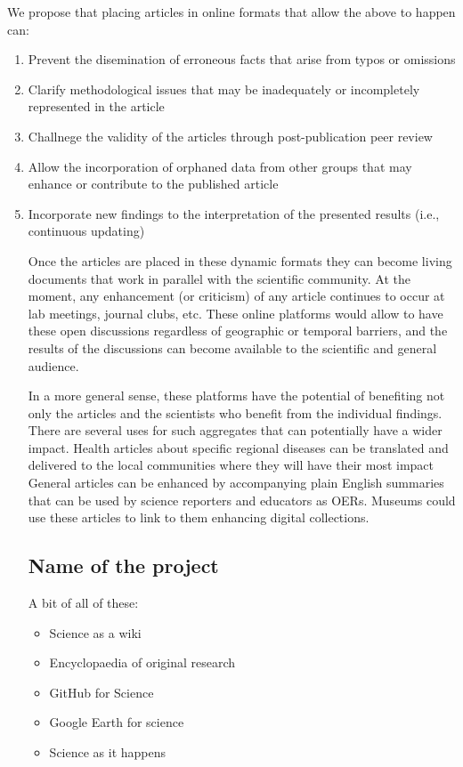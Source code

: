 \documentclass[final,authoryear,3p]{elsarticle-open-drafting}
\begin{document}
We propose that placing articles in online formats that allow the above to happen can:
\begin{enumerate}
\item Prevent the disemination of erroneous facts that arise from typos or omissions
\item Clarify methodological issues that may be inadequately or incompletely represented in the article
\item Challnege the validity of the articles through post-publication peer review
\item Allow the incorporation of orphaned data from other groups that may enhance or contribute to the published article
\item Incorporate new findings to the interpretation of the presented results (i.e., continuous updating)


Once the articles are placed in these dynamic formats they can become living documents that work in parallel with the scientific community. At the moment, any enhancement (or criticism) of any article continues to occur at lab meetings, journal clubs, etc. These online platforms would allow to have these open discussions regardless of geographic or temporal barriers, and the results of the discussions can become available to the scientific and general audience. 

In a more general sense, these platforms have the potential of benefiting not only the articles and the scientists who benefit from the individual findings. There are several uses for such aggregates that can potentially have a wider impact. 
Health articles about specific regional diseases can be translated and delivered to the local communities where they will have their most impact
General articles can be enhanced by accompanying plain English summaries that can be used by science reporters and educators as OERs. 
Museums could use these articles to link to them enhancing digital collections. 


\subsection{Name of the project}
A bit of all of these:
\begin{itemize}
	\item Science as a wiki
	\item Encyclopaedia of original research
	\item GitHub for Science
	\item Google Earth for science
	\item Science as it happens
\end{itemize}

\end{enumerate}
\end{document}
